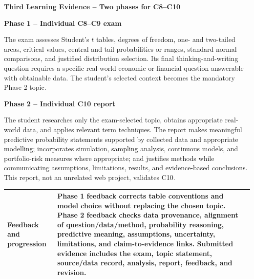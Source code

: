 \documentclass[10pt,letterpaper]{article}
\newcommand{\plansubsection}[1]{%
	\Needspace{7\baselineskip}\par\vspace{6pt}%
	\begin{tcolorbox}[
		colback=sectionblue!13,
		colframe=borderblue,
		boxrule=1.15pt,
		sharp corners,
		left=6pt,right=6pt,top=4pt,bottom=4pt,
		before skip=0pt,after skip=0pt]
		\bfseries #1
	\end{tcolorbox}%
}
\newcommand{\criterionpart}[1]{%
	\Needspace{10\baselineskip}\par\vspace{5pt}%
	\begin{tcolorbox}[
		colback=sectionblue!7,
		colframe=borderblue,
		boxrule=0.8pt,
		sharp corners,
		left=6pt,right=6pt,top=3pt,bottom=3pt,
		before skip=0pt,after skip=2pt]
		\bfseries #1
	\end{tcolorbox}%
}
\newcommand{\labelled}[2]{%
	\noindent
	\begin{tabularx}{\textwidth}{|>{\RaggedRight\arraybackslash\bfseries}p{2.12in}|>{\RaggedRight\arraybackslash}X|}
		\hline
		#1 & #2\\
		\hline
	\end{tabularx}\par\vspace{-\arrayrulewidth}%
}
\begin{document}
\plansubsection{Third Learning Evidence -- Two phases for C8--C10}
\criterionpart{Phase 1 -- Individual C8--C9 exam}
\begin{bluebox}
The exam assesses Student's $t$ tables, degrees of freedom, one- and two-tailed areas, critical values, central and tail probabilities or ranges, standard-normal comparisons, and justified distribution selection. Its final thinking-and-writing question requires a specific real-world economic or financial question answerable with obtainable data. The student's selected context becomes the mandatory Phase 2 topic.
\end{bluebox}
\criterionpart{Phase 2 -- Individual C10 report}
\begin{bluebox}
The student researches only the exam-selected topic, obtains appropriate real-world data, and applies relevant term techniques. The report makes meaningful predictive probability statements supported by collected data and appropriate modelling; incorporates simulation, sampling analysis, continuous models, and portfolio-risk measures where appropriate; and justifies methods while communicating assumptions, limitations, results, and evidence-based conclusions. This report, not an unrelated web project, validates C10.
\end{bluebox}
\labelled{Feedback and progression}{Phase 1 feedback corrects table conventions and model choice without replacing the chosen topic. Phase 2 feedback checks data provenance, alignment of question/data/method, probability reasoning, predictive meaning, assumptions, uncertainty, limitations, and claim-to-evidence links. Submitted evidence includes the exam, topic statement, source/data record, analysis, report, feedback, and revision.}
\end{document}
